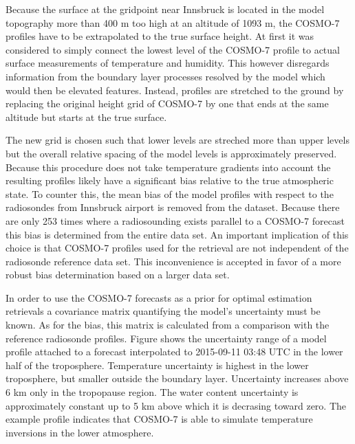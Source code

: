         {}

    Because the surface at the gridpoint near Innsbruck is located in the model
    topography more than 400 m too high at an altitude of 1093 m, the COSMO-7
    profiles have to be extrapolated to the true surface height. At first it was
    considered to simply connect the lowest level of the COSMO-7 profile to
    actual surface measurements of temperature and humidity. This however
    disregards information from the boundary layer processes resolved by the
    model which would then be elevated features. Instead, profiles are
    stretched to the ground by replacing the original height grid of COSMO-7
    by one that ends at the same altitude but starts at the true surface.

    The new grid is chosen such that lower levels are streched more than
    upper levels but the overall relative spacing of the model levels is
    approximately preserved. Because this procedure does not take temperature
    gradients into account the resulting profiles likely have a significant
    bias relative to the true atmospheric state. To counter this, the mean
    bias of the model profiles with respect to the radiosondes from Innsbruck
    airport is removed from the dataset. Because there are only 253 times
    where a radiosounding exists parallel to a COSMO-7 forecast this bias is
    determined from the entire data set. An important implication of this
    choice is that COSMO-7 profiles used for the retrieval are not independent
    of the radiosonde reference data set. This inconvenience is accepted in
    favor of a more robust bias determination based on a larger data set.

    In order to use the COSMO-7 forecasts as a prior for optimal estimation
    retrievals a covariance matrix quantifying the model's uncertainty must
    be known. As for the bias, this matrix is calculated from a comparison
    with the reference radiosonde profiles. Figure 
    shows the uncertainty range of a model profile attached to a forecast
    interpolated to 2015-09-11 03:48 UTC in the lower half of the troposphere.
    Temperature uncertainty is highest in the lower troposphere, but smaller
    outside the boundary layer. Uncertainty increases above 6 km only in the
    tropopause region. The water content uncertainty is approximately constant
    up to 5 km above which it is decrasing toward zero. The example profile
    indicates that COSMO-7 is able to simulate temperature inversions in the
    lower atmosphere.

